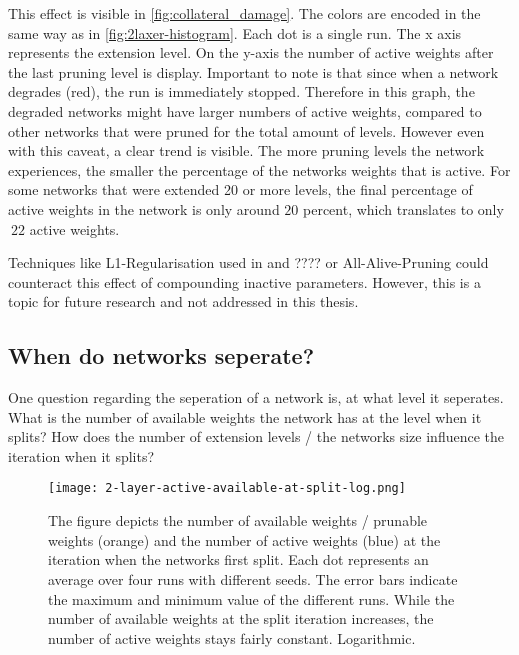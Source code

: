 This effect is visible in \ref{fig:collateral_damage}.
The colors are encoded in the same way as in \ref{fig:2laxer-histogram}.
Each dot is a single run. 
The x axis represents the extension level.
On the y-axis the number of active weights after the last pruning level is display.
Important to note is that since when a network degrades (red), the run is immediately stopped.
Therefore in this graph, the degraded networks might have larger numbers of active weights, compared to other networks that were pruned for the total amount of levels.
However even with this caveat, a clear trend is visible.
The more pruning levels the network experiences, the smaller the percentage of the networks weights that is active.
For some networks that were extended 20 or more levels, the final percentage of active weights in the network is only around $20$ percent, which translates to only $~22$ active weights.

Techniques like L1-Regularisation used in \autocite{HanEtAl15} and ??\autocite{DBLP:conf/iclr/FrankleC19}?? or All-Alive-Pruning \autocite{AllAlivePruning} could counteract this effect of compounding inactive parameters.
However, this is a topic for future research and not addressed in this thesis. 

\subsection{When do networks seperate?}
One question regarding the seperation of a network is, at what level it seperates.
What is the number of available weights the network has at the level when it splits?
How does the number of extension levels / the networks size influence the iteration when it splits?

\begin{figure}[ht]
    \centering
    \texttt{[image: 2-layer-active-available-at-split-log.png]}
    \caption{
        The figure depicts the number of available weights / prunable weights (orange) and the number of active weights (blue) at the iteration when the networks first split.
        Each dot represents an average over four runs with different seeds.
        The error bars indicate the maximum and minimum value of the different runs.
        While the number of available weights at the split iteration increases, the number of active weights stays fairly constant.
        Logarithmic.
    }
    \label{fig:2l-active-split}
\end{figure}

